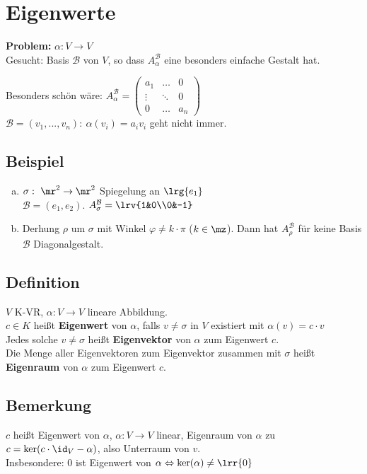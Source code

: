 \newpage
\section{Eigenwerte}
  \textbf{Problem:} $\alpha:V\rightarrow V$\\
  Gesucht: Basis $\mathcal{B}$  von $V$, so dass $A_\alpha^{\mathcal{B}}$ eine
  besonders einfache Gestalt hat.

  Besonders schön wäre: $A_\alpha^{\mathcal{B}}=
  \begin{pmatrix}
    a_1&\dots&0\\
    \vdots&\ddots&0\\
    0&\dots&a_n
  \end{pmatrix}$\\
  $\mathcal{B}=(v_1,...,v_n):\ \alpha(v_i)=a_iv_i$ geht nicht immer.

\subsection{Beispiel}
  \begin{enumerate}[a)]
    \item $\sigma:\ \mr^2\rightarrow\mr^2$ Spiegelung an $\lrg{e_1}$\\
      $\mathcal{B}=(e_1,e_2)$. $A_\sigma^{\mathcal{B}}=\lrv{1&0\\0&-1}$
    \item Derhung $\rho$ um $\sigma$ mit Winkel $\varphi\neq k\cdot\pi$
      ($k\in\mz$). Dann hat $A_\rho^{\mathcal{B}}$ für keine Basis
      ${\mathcal{B}}$ Diagonalgestalt.
  \end{enumerate}

\subsection{Definition}
  $V$ K-VR, $\alpha:V\rightarrow V$ lineare Abbildung.\\
  $c\in K$ heißt \textbf{Eigenwert} von $\alpha$, falls $v\neq\sigma$ in $V$
  existiert mit $\alpha(v)=c\cdot v$\\
  Jedes solche $v\neq\sigma$ heißt \textbf{Eigenvektor} von $\alpha$ zum
  Eigenwert $c$.\\
  Die Menge aller Eigenvektoren zum Eigenvektor zusammen mit $\sigma$ heißt
  \textbf{Eigenraum} von $\alpha$ zum Eigenwert $c$.

\subsection{Bemerkung}
  $c$ heißt Eigenwert von $\alpha$, $\alpha:V\rightarrow V$ linear, Eigenraum
  von $\alpha$ zu $c=\mbox{ker}(c\cdot\id_V-\alpha)$, also Unterraum von $v$.\\
  Insbesondere: $0$ ist Eigenwert von
  $\alpha\Leftrightarrow\mbox{ker}(\alpha)\neq\lrr{0}$

